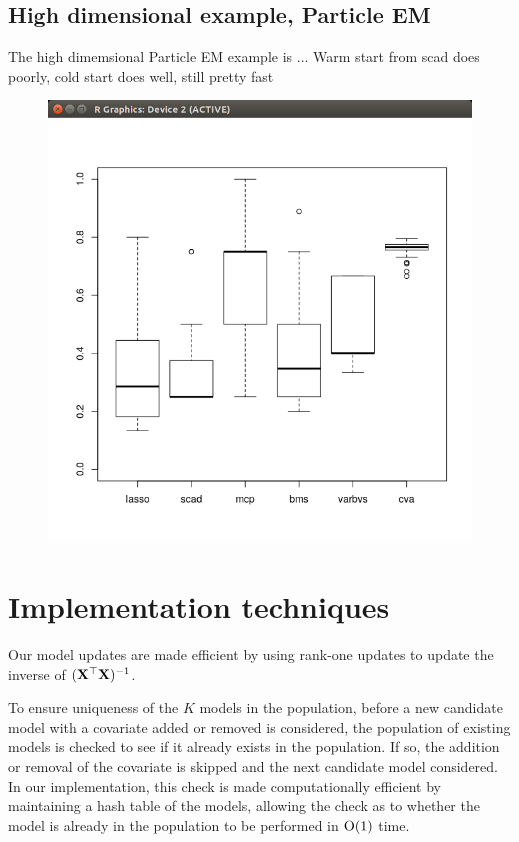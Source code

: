 \documentclass{amsart}[12pt]
\begin{document}
\subsection{High dimensional example, Particle EM}
The high dimemsional Particle EM example is ...
Warm start from scad does poorly, cold start does well, still pretty fast
\begin{figure}
\includegraphics{Particle_EM_high_dimensional_cold_start.png}
\end{figure}

\section{Implementation techniques}
Our model updates are made efficient by using rank-one updates to update the inverse of $({\bf X}^\top {\bf X})^{-1}$.

To ensure uniqueness of the $K$ models in the population, before a new candidate model with a covariate added
or removed is considered, the population of existing models is checked to see if it already exists in the
population. If so, the addition or removal of the covariate is skipped and the next candidate model considered.
In our implementation, this check is made computationally efficient by maintaining a hash table of the models,
allowing the check as to whether the model is already in the population to be performed in $\text{O}(1)$ time.
\end{document}
